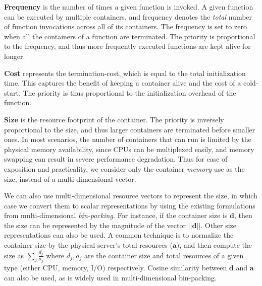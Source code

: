 \noindent \textbf{Frequency} is the number of times a given function is invoked.
A given function can be executed by multiple containers, and frequency denotes the \emph{total} number of function invocations across all of its containers. 
The frequency is set to zero when all the containers of a function are terminated.
The priority is proportional to the frequency, and thus more frequently executed functions are kept alive for longer. 
%
%


\noindent \textbf{Cost} represents the termination-cost, which is equal to the total initialization time. 
This captures the benefit of keeping a container alive and the cost of a cold-start. 
The priority is thus proportional to the initialization overhead of the function. 



\noindent \textbf{Size} is the resource footprint of the container. 
The priority is inversely proportional to the size, and thus larger containers are terminated before smaller ones. 
In most scenarios, the number of containers that can run is limited by the physical memory availability, since CPUs can be multiplexed easily, and memory swapping can result in severe performance degradation.
Thus for ease of exposition and practicality, we consider only the container \emph{memory} use as the size, instead of a multi-dimensional vector. 


We can also use multi-dimensional resource vectors to represent the size, in which case we convert them to scalar representations by using the existing formulations from multi-dimensional \emph{bin-packing.}
For instance, if the container size is $\mathbf{d}$, then the size can be represented by the magnitude of the vector $||\mathbf{d}||$.
Other size representations can also be used.
A common technique is to normalize the container size by the physical server's total resources ($\mathbf{a}$), and then compute the size as $\sum_j \frac{d_j}{a_j}$ where $d_j, a_j$ are the container size and total resources of a given type (either CPU, memory, I/O) respectively.
Cosine similarity between $\mathbf{d}$ and $\mathbf{a}$ can also be used, as is widely used in multi-dimensional bin-packing.  



